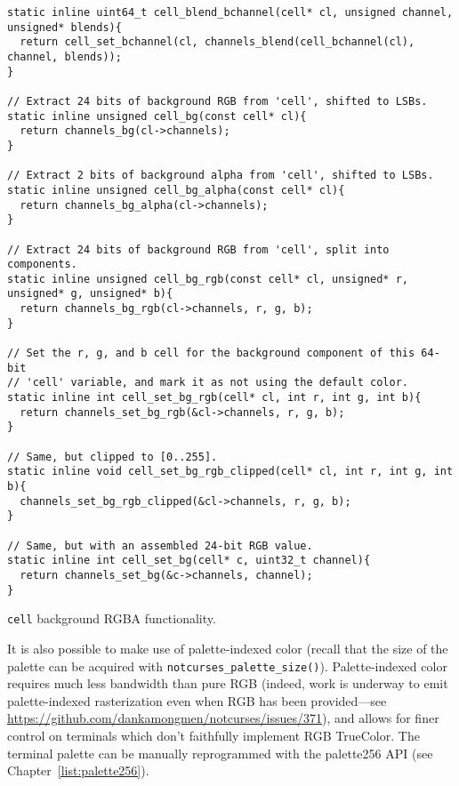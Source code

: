 \begin{listing}[!htb]
\begin{verbatim}
static inline uint64_t cell_blend_bchannel(cell* cl, unsigned channel, unsigned* blends){
  return cell_set_bchannel(cl, channels_blend(cell_bchannel(cl), channel, blends));
}

// Extract 24 bits of background RGB from 'cell', shifted to LSBs.
static inline unsigned cell_bg(const cell* cl){
  return channels_bg(cl->channels);
}

// Extract 2 bits of background alpha from 'cell', shifted to LSBs.
static inline unsigned cell_bg_alpha(const cell* cl){
  return channels_bg_alpha(cl->channels);
}

// Extract 24 bits of background RGB from 'cell', split into components.
static inline unsigned cell_bg_rgb(const cell* cl, unsigned* r, unsigned* g, unsigned* b){
  return channels_bg_rgb(cl->channels, r, g, b);
}

// Set the r, g, and b cell for the background component of this 64-bit
// 'cell' variable, and mark it as not using the default color.
static inline int cell_set_bg_rgb(cell* cl, int r, int g, int b){
  return channels_set_bg_rgb(&cl->channels, r, g, b);
}

// Same, but clipped to [0..255].
static inline void cell_set_bg_rgb_clipped(cell* cl, int r, int g, int b){
  channels_set_bg_rgb_clipped(&cl->channels, r, g, b);
}

// Same, but with an assembled 24-bit RGB value.
static inline int cell_set_bg(cell* c, uint32_t channel){
  return channels_set_bg(&c->channels, channel);
}
\end{verbatim}
\caption{\texttt{cell} background RGBA functionality.}
\label{listing:cellrgbbg}
\end{listing}

It is also possible to make use of palette-indexed color (recall that the size
of the palette can be acquired with \texttt{notcurses\_palette\_size()}).
Palette-indexed color requires much less bandwidth than pure RGB (indeed, work
is underway to emit palette-indexed rasterization even when RGB has been
provided---see \url{https://github.com/dankamongmen/notcurses/issues/371}),
and allows for finer control on terminals which don't faithfully implement RGB
TrueColor. The terminal palette can be manually reprogrammed with the
palette256 API (see Chapter~\ref{list:palette256}).

